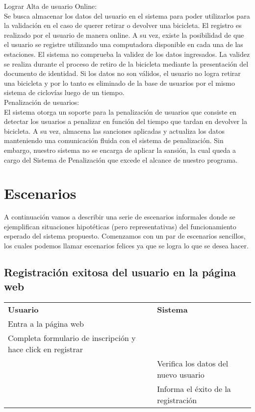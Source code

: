 \documentclass[a4paper, 11pt, spanish]{article}
\begin{document}
Lograr Alta de usuario Online:\\

Se busca almacenar los datos del usuario en el sistema para poder utilizarlos para la validación en el caso de querer retirar o devolver una bicicleta. El registro es realizado por el usuario de manera online. A su vez, existe la posibilidad de que el usuario se registre utilizando una computadora disponible en cada una de las estaciones. El sistema no comprueba la validez de los datos ingresados. La validez se realiza durante el proceso de retiro de la bicicleta mediante la presentación del documento de identidad. Si los datos no son válidos, el usuario no logra retirar una bicicleta y por lo tanto es eliminado de la base de usuarios por el mismo sistema de ciclovías luego de un tiempo.\\

Penalización de usuarios:\\

El sistema otorga un soporte para la penalización de usuarios que consiste en detectar los usuarios a penalizar en función del tiempo que tardan en devolver la bicicleta. A su vez, almacena las sanciones aplicadas y actualiza los datos manteniendo una comunicación fluida con el sistema de penalización. Sin embargo, nuestro sistema no se encarga de aplicar la sansión, la cual queda a cargo del Sistema de Penalización que excede el alcance de nuestro programa.\\


\newpage
\section{Escenarios}
A continuación vamos a describir una serie de escenarios informales donde se ejemplifican situaciones hipotéticas (pero representativas) del funcionamiento esperado del sistema propuesto.
Comenzamos con un par de escenarios sencillos, los cuales podemos llamar escenarios felices ya que se logra lo que se desea hacer.

\subsection{Registración exitosa del usuario en la página web}

\begingroup
    \fontsize{8pt}{12pt}\selectfont

\begin{tabular}{|p{7cm}|p{7cm}|}
\cline{1-2}
\textbf{Usuario} & \textbf{Sistema} \\ \cline{1-2}
Entra a la página web & \\ \cline{1-2}
Completa formulario de inscripción y hace click en registrar& \\ \cline{1-2}
 &Verifica los datos del nuevo usuario \\ \cline{1-2}
 &Informa el éxito de la registración\\ \cline{1-2}
\end{tabular}
\end{document}

